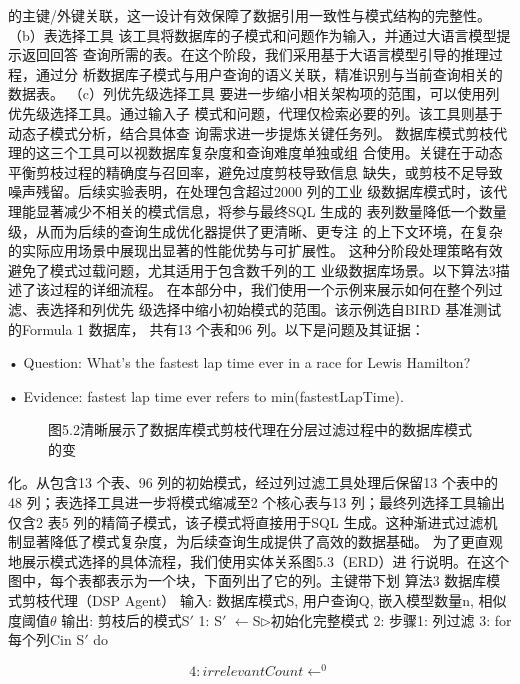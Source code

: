 \documentclass[12pt,a4paper,openright,UTF8]{ctexbook}
\begin{document}
的主键/外键关联，这一设计有效保障了数据引用一致性与模式结构的完整性。 （b）表选择工具 该工具将数据库的子模式和问题作为输入，并通过大语言模型提示返回回答 查询所需的表。在这个阶段，我们采用基于大语言模型引导的推理过程，通过分 析数据库子模式与用户查询的语义关联，精准识别与当前查询相关的数据表。 （c）列优先级选择工具 要进一步缩小相关架构项的范围，可以使用列优先级选择工具。通过输入子 模式和问题，代理仅检索必要的列。该工具则基于动态子模式分析，结合具体查 询需求进一步提炼关键任务列。 数据库模式剪枝代理的这三个工具可以视数据库复杂度和查询难度单独或组 合使用。关键在于动态平衡剪枝过程的精确度与召回率，避免过度剪枝导致信息 缺失，或剪枝不足导致噪声残留。后续实验表明，在处理包含超过2000 列的工业 级数据库模式时，该代理能显著减少不相关的模式信息，将参与最终SQL 生成的 表列数量降低一个数量级，从而为后续的查询生成优化器提供了更清晰、更专注 的上下文环境，在复杂的实际应用场景中展现出显著的性能优势与可扩展性。 这种分阶段处理策略有效避免了模式过载问题，尤其适用于包含数千列的工 业级数据库场景。以下算法3描述了该过程的详细流程。 在本部分中，我们使用一个示例来展示如何在整个列过滤、表选择和列优先 级选择中缩小初始模式的范围。该示例选自BIRD 基准测试的Formula 1 数据库， 共有13 个表和96 列。以下是问题及其证据：

• Question: What’s the fastest lap time ever in a race for Lewis Hamilton?

• Evidence: fastest lap time ever refers to min(fastestLapTime).

\begin{figure}[htbp]
\centering
{}
\caption{图5.2清晰展示了数据库模式剪枝代理在分层过滤过程中的数据库模式的变}
\end{figure}

化。从包含13 个表、96 列的初始模式，经过列过滤工具处理后保留13 个表中的 48 列；表选择工具进一步将模式缩减至2 个核心表与13 列；最终列选择工具输出 仅含2 表5 列的精简子模式，该子模式将直接用于SQL 生成。这种渐进式过滤机 制显著降低了模式复杂度，为后续查询生成提供了高效的数据基础。 为了更直观地展示模式选择的具体流程，我们使用实体关系图5.3（ERD）进 行说明。在这个图中，每个表都表示为一个块，下面列出了它的列。主键带下划 算法3 数据库模式剪枝代理（DSP Agent） 输入: 数据库模式S, 用户查询Q, 嵌入模型数量n, 相似度阈值$\theta$ 输出: 剪枝后的模式S$'$ 1: S$'$ $\leftarrow$S$\triangleright$初始化完整模式 2: 步骤1: 列过滤 3: for 每个列Cin S$'$ do

\begin{equation*}
4:irrelevantCount\leftarrow^0
\end{equation*}
\end{document}
